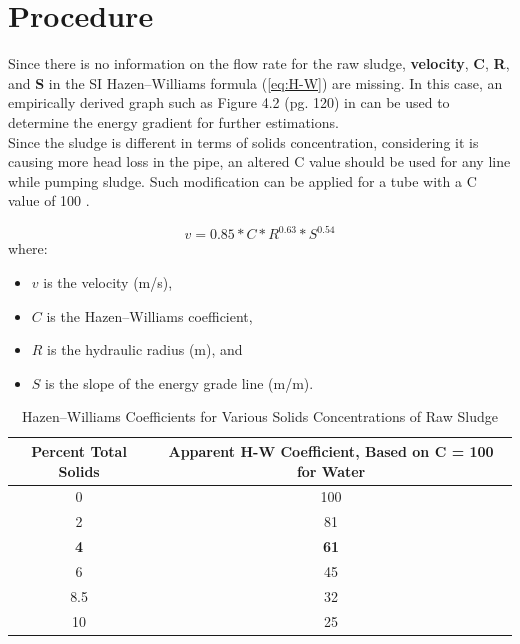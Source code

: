 \documentclass[a4paper]{article}
\begin{document}
\section*{Procedure}
\begin{minipage}[c]{0.6\textwidth}
Since there is no information on the flow rate for the raw sludge, \textbf{velocity}, \textbf{C}, \textbf{R}, and \textbf{S} in the SI Hazen–Williams formula (\ref{eq:H-W}) are missing. In this case, an empirically derived graph such as Figure 4.2 (pg. 120) in \textcite{sanin2011} can be used to determine the energy gradient for further estimations.\\
Since the sludge is different in terms of solids concentration, considering it is causing more head loss in the pipe, an altered C value should be used for any line while pumping sludge. Such modification can be applied for a tube with a C value of 100 \autocite{brisbin1957}.
\end{minipage}
\hfill
\begin{minipage}{0.35\textwidth}
\end{minipage}
\medskip
\begin{equation}
    v=0.85*C*R^{0.63}*S^{0.54} \label{eq:H-W}
\end{equation}
where:
\begin{itemize}[label = ]
    \item $v$ is the velocity (m/s),
    \item $C$ is the Hazen–Williams coefficient,
    \item $R$ is the hydraulic radius (m), and
    \item $S$ is the slope of the energy grade line (m/m).
\end{itemize}
\begin{table}[ht]
    \centering
    \caption{Hazen–Williams Coefficients for Various Solids Concentrations of Raw Sludge \autocite{brisbin1957}}
    \begin{tabular}{cc}
    \toprule
    Percent Total Solids & Apparent H-W Coefficient, Based on C = 100 for Water \\
    \midrule
    0 & 100 \\
    2 & 81 \\
    \textbf{4} & \textbf{61} \\
    6 & 45 \\
    8.5 & 32 \\
    10 & 25 \\
    \bottomrule
    \end{tabular}
    \label{tab:H-WCoeffs}
\end{table}
\end{document}
